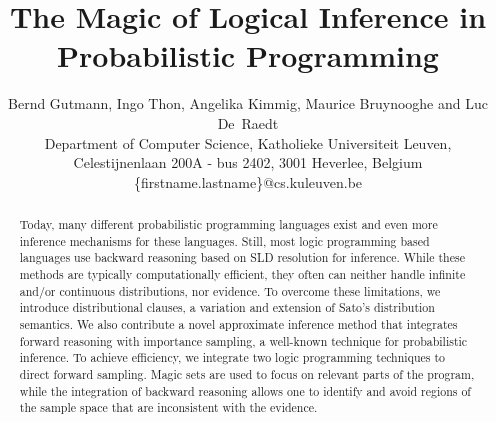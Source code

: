 \documentclass{tlp}
\begin{document}
 

\title{The Magic of Logical Inference in Probabilistic Programming}

\author[B.~Gutmann, I.~Thon, A.~Kimmig, M.~Bruynooghe, L.~De~Raedt]{Bernd Gutmann,
            Ingo Thon, Angelika Kimmig, Maurice Bruynooghe and Luc De~Raedt \\
            Department of Computer Science, Katholieke Universiteit Leuven,\\
            Celestijnenlaan 200A - bus 2402, 3001 Heverlee, Belgium\\
            \{firstname.lastname\}@cs.kuleuven.be}

 \maketitle

\begin{abstract} 
  Today, many different probabilistic programming languages exist and
  even more inference mechanisms for these languages.  Still, most
  logic programming based languages use backward reasoning based on
  SLD resolution for inference. While these methods are typically
  computationally efficient, they often can neither handle infinite
  and/or continuous distributions, nor evidence.  To overcome these
  limitations, we introduce distributional clauses, a variation and
  extension of Sato's distribution semantics. We also contribute a
  novel approximate inference method that integrates forward reasoning
  with importance sampling, a well-known technique for probabilistic
  inference. To achieve efficiency, we integrate two logic programming
  techniques to direct forward sampling. Magic sets are used to focus
  on relevant parts of the program, while the integration of backward
  reasoning allows one to identify and avoid regions of the sample
  space that are inconsistent with the evidence.
\end{abstract}
\end{document}
